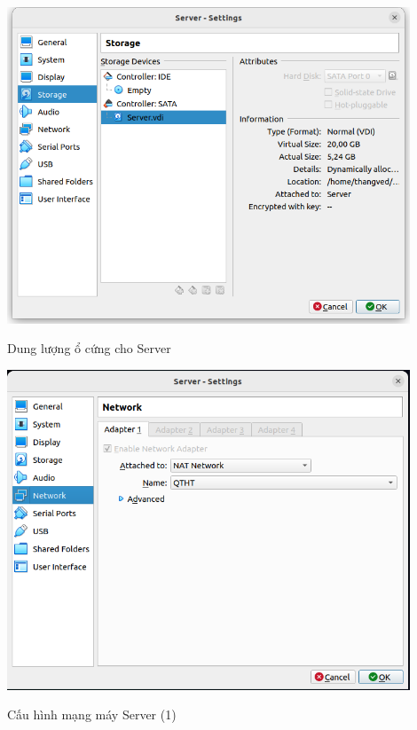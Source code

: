 \documentclass[a4paper, 11pt]{article}
\begin{document}
\begin{itemize}
\begin{enumerate}
                    \begin{minipage}
                        {\linewidth}
                        \captionsetup{type=figure}
                        \centering
                        \includegraphics[width=12cm]{images/server-disk.png}
                        \caption{Dung lượng ổ cứng cho Server}
                        \label{figure:server-disk}
                    \end{minipage}

                    \begin{minipage}
                        {\linewidth}
                        \captionsetup{type=figure}
                        \centering
                        \includegraphics[width=12cm]{images/server-network-1.png}
                        \caption{Cấu hình mạng máy Server (1)}
                        \label{figure:server-network-1}
                    \end{minipage}


\end{enumerate}
\end{itemize}
\end{document}
